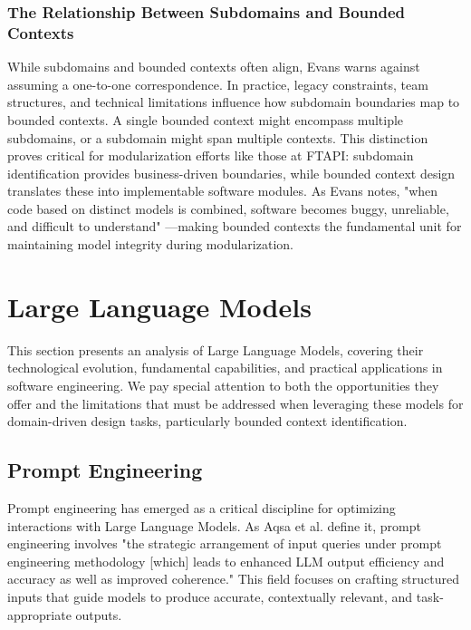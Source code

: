 \subsubsection{The Relationship Between Subdomains and Bounded Contexts}
While subdomains and bounded contexts often align, Evans \autocite[]{Evans2003} warns against assuming a one-to-one correspondence. In practice, legacy constraints, team structures, and technical limitations influence how subdomain boundaries map to bounded contexts. A single bounded context might encompass multiple subdomains, or a subdomain might span multiple contexts.
This distinction proves critical for modularization efforts like those at FTAPI: subdomain identification provides business-driven boundaries, while bounded context design translates these into implementable software modules. As Evans notes, "when code based on distinct models is combined, software becomes buggy, unreliable, and difficult to understand" \autocite[p.~271]{Evans2003}—making bounded contexts the fundamental unit for maintaining model integrity during modularization.


\section{Large Language Models}
This section presents an analysis of Large Language Models, covering their technological evolution, fundamental capabilities, and practical applications in software engineering. We pay special attention to both the opportunities they offer and the limitations that must be addressed when leveraging these models for domain-driven design tasks, particularly bounded context identification.

\subsection{Prompt Engineering}
Prompt engineering has emerged as a critical discipline for optimizing interactions with Large Language Models. As Aqsa et al. \autocite[]{promptAqsa} define it, prompt engineering involves "the strategic arrangement of input queries under prompt engineering methodology [which] leads to enhanced LLM output efficiency and accuracy as well as improved coherence." This field focuses on crafting structured inputs that guide models to produce accurate, contextually relevant, and task-appropriate outputs.

